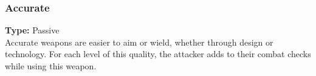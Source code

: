 \subsubsection{Accurate}
\label{iqty:accurate}
\textbf{Type:} Passive\\
Accurate weapons are easier to aim or wield, whether
through design or technology. For each level of this
quality, the attacker adds \boost to their combat checks
while using this weapon.
